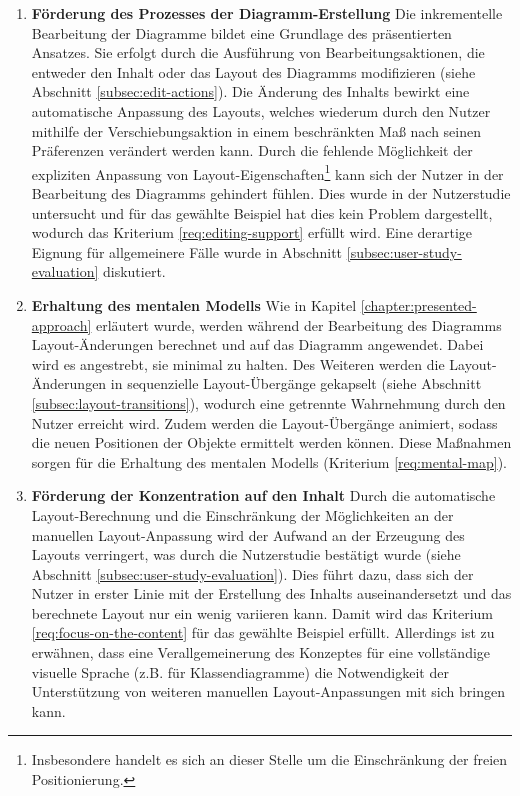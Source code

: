 \begin{enumerate}[label={K.\arabic*}]
\item
\label{eval:editing-support}
\textbf{Förderung des Prozesses der Diagramm-Erstellung}
Die inkrementelle Bearbeitung der Diagramme bildet eine Grundlage des präsentierten Ansatzes. Sie erfolgt durch die Ausführung von Bearbeitungsaktionen, die entweder den Inhalt oder das Layout des Diagramms modifizieren (siehe Abschnitt \ref{subsec:edit-actions}). Die Änderung des Inhalts bewirkt eine automatische Anpassung des Layouts, welches wiederum durch den Nutzer mithilfe der Verschiebungsaktion in einem beschränkten Maß nach seinen Präferenzen verändert werden kann. Durch die fehlende Möglichkeit der expliziten Anpassung von Layout-Eigenschaften\footnote{Insbesondere handelt es sich an dieser Stelle um die Einschränkung der freien Positionierung.} kann sich der Nutzer in der Bearbeitung des Diagramms gehindert fühlen. Dies wurde in der Nutzerstudie untersucht und für das gewählte Beispiel hat dies kein Problem dargestellt, wodurch das Kriterium \ref{req:editing-support} erfüllt wird. Eine derartige Eignung für allgemeinere Fälle wurde in Abschnitt \ref{subsec:user-study-evaluation} diskutiert.

\item
\label{eval:mental-map}
\textbf{Erhaltung des mentalen Modells}
Wie in Kapitel \ref{chapter:presented-approach} erläutert wurde, werden während der Bearbeitung des Diagramms Layout-Änderungen berechnet und auf das Diagramm angewendet. Dabei wird es angestrebt, sie minimal zu halten. Des Weiteren werden die Layout-Änderungen in sequenzielle Layout-Übergänge gekapselt (siehe Abschnitt \ref{subsec:layout-transitions}), wodurch eine getrennte Wahrnehmung durch den Nutzer erreicht wird. Zudem werden die Layout-Übergänge animiert, sodass die neuen Positionen der Objekte ermittelt werden können. Diese Maßnahmen sorgen für die Erhaltung des mentalen Modells (Kriterium \ref{req:mental-map}).

\item
\label{eval:focus-on-the-content}
\textbf{Förderung der Konzentration auf den Inhalt}
Durch die automatische Layout-Be\-rech\-nung und die Einschränkung der Möglichkeiten an der manuellen Layout-Anpassung wird der Aufwand an der Erzeugung des Layouts verringert, was durch die Nutzerstudie bestätigt wurde (siehe Abschnitt \ref{subsec:user-study-evaluation}). Dies führt dazu, dass sich der Nutzer in erster Linie mit der Erstellung des Inhalts auseinandersetzt und das berechnete Layout nur ein wenig variieren kann. Damit wird das Kriterium \ref{req:focus-on-the-content} für das gewählte Beispiel erfüllt. Allerdings ist zu erwähnen, dass eine Verallgemeinerung des Konzeptes für eine vollständige visuelle Sprache (z.B. für Klassendiagramme) die Notwendigkeit der Unterstützung von weiteren manuellen Layout-Anpassungen mit sich bringen kann.


\end{enumerate}
